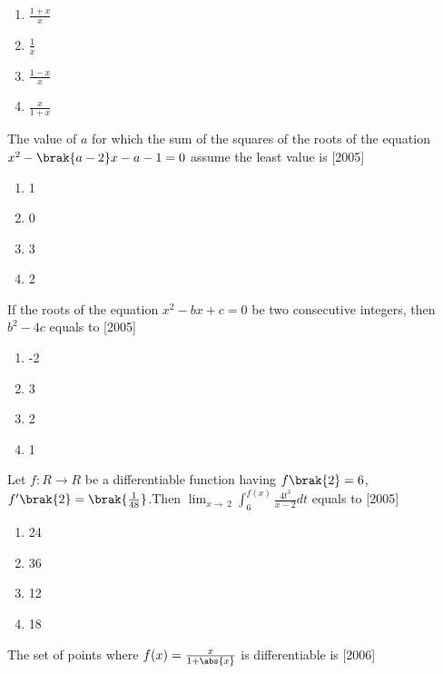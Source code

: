     \begin{multicols}{4}
    \begin{enumerate}
    \item $\frac{1+x}{x}$
    \item $\frac{1}{x}$
    \item $\frac{1-x}{x}$
    \item $\frac{x}{1+x}$
\end{enumerate}
\end{multicols}
\item The value of $a$ for which the sum of the squares of the roots of the equation $x^2-\brak{a-2}x-a-1=0$ assume the least value is
\hfill[2005]
\begin{multicols}{4}
\begin{enumerate}
    \item 1
    \item 0
    \item 3
    \item 2
    \end{enumerate}
    \end{multicols}
    \item If the roots of the equation $x^2-bx+c=0$ be   two  consecutive integers, then $b^2-4c$  equals  to
    \hfill[2005]
    \begin{multicols}{4}
    \begin{enumerate}
        \item -2
        \item 3
        \item 2
        \item 1
    \end{enumerate}
    \end{multicols}
    \item Let $f:R\rightarrow R$ be a differentiable function having $f\brak{2}=6$,$f^{\prime}\brak{2}=\brak{\frac{1}{48}}$.Then $\lim_{x\to\ 2} \int_{6}^{f(x)} \frac{4t^3}{x-2} dt$ equals to
    \hfill[2005]
    \begin{multicols}{4}
        
   
    \begin{enumerate}
    \item 24
    \item 36
    \item 12
    \item 18
    \end{enumerate}
     \end{multicols}
    \item The set of points where $f(x)=\frac{x}{1+\abs{x}}$ is differentiable is \hfill[2006]

